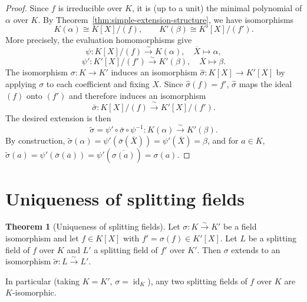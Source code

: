 \documentclass[12pt,a4paper,openany]{book}
\theoremstyle{definition}
\newtheorem{theorem}{Theorem}[chapter]
\theoremstyle{remark}
\DeclareMathOperator{\id}{id}
\begin{document}
\begin{proof}
Since $f$ is irreducible over $K$, it is (up to a unit) the minimal
polynomial of $\alpha$ over $K$. By
Theorem~\ref{thm:simple-extension-structure}, we have isomorphisms
\[
  K(\alpha) \cong K[X]/(f), \qquad K'(\beta) \cong K'[X]/(f').
\]
More precisely, the evaluation homomorphisms give
\[
  \psi \colon K[X]/(f) \xrightarrow{\sim} K(\alpha), \quad
  \overline{X} \mapsto \alpha,
\]
\[
  \psi' \colon K'[X]/(f') \xrightarrow{\sim} K'(\beta), \quad
  \overline{X} \mapsto \beta.
\]
The isomorphism $\sigma \colon K \to K'$ induces an isomorphism
$\hat{\sigma} \colon K[X] \to K'[X]$ by applying $\sigma$ to each
coefficient and fixing $X$. Since $\hat{\sigma}(f) = f'$,
$\hat{\sigma}$ maps the ideal $(f)$ onto $(f')$ and therefore induces
an isomorphism
\[
  \bar{\sigma} \colon K[X]/(f) \xrightarrow{\;\sim\;} K'[X]/(f').
\]
The desired extension is then
\[
  \tilde{\sigma} = \psi' \circ \bar{\sigma} \circ \psi^{-1}
  \colon K(\alpha) \xrightarrow{\;\sim\;} K'(\beta).
\]
By construction, $\tilde{\sigma}(\alpha) = \psi'(\bar{\sigma}(
\overline{X})) = \psi'(\overline{X}) = \beta$, and for $a \in K$,
$\tilde{\sigma}(a) = \psi'(\bar{\sigma}(\overline{a})) =
\psi'(\overline{\sigma(a)}) = \sigma(a)$.
\end{proof}

\section{Uniqueness of splitting fields}
\label{sec:splitting-uniqueness}

\begin{theorem}[Uniqueness of splitting fields]
\label{thm:splitting-uniqueness}
Let $\sigma \colon K \xrightarrow{\sim} K'$ be a field isomorphism
and let $f \in K[X]$ with $f' = \sigma(f) \in K'[X]$. Let $L$ be a
splitting field of $f$ over $K$ and $L'$ a splitting field of $f'$
over $K'$. Then $\sigma$ extends to an isomorphism
$\tilde{\sigma} \colon L \xrightarrow{\sim} L'$.

In particular (taking $K = K'$, $\sigma = \id_K$), any two splitting
fields of $f$ over $K$ are $K$-isomorphic.
\end{theorem}
\end{document}

